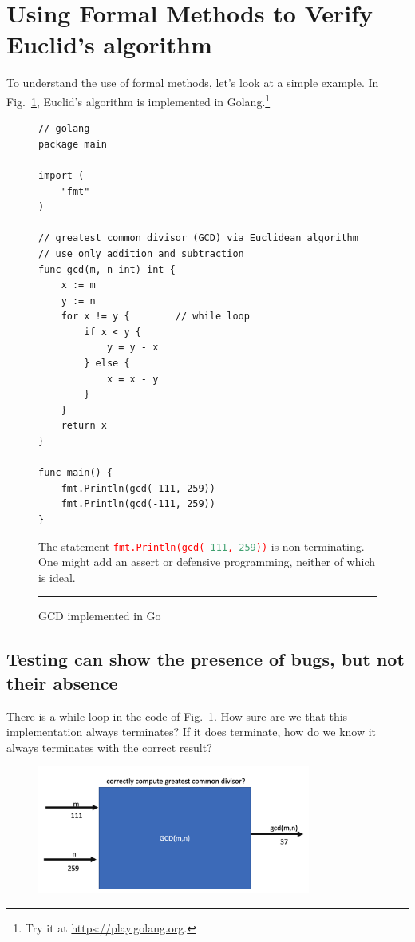 \documentclass[runningheads,12pt]{article}
\newcommand{\e}[1]{\lstinline[language=eiffel]|#1|}
\begin{document}
\section{Using Formal Methods to Verify Euclid's algorithm}

\noindent To understand the use of formal methods, let's look at a simple example. In Fig.~\ref{fig:gcd-c}, Euclid's algorithm is implemented in Golang.\footnote{%
Try it at \url{https://play.golang.org}.} 

\begin{figure}[!htb]
\begin{framed}
\begin{Verbatim}[fontsize=\small]
// golang
package main

import (
	"fmt"
)

// greatest common divisor (GCD) via Euclidean algorithm
// use only addition and subtraction 
func gcd(m, n int) int {
	x := m
	y := n
	for x != y {		// while loop
		if x < y {
			y = y - x
		} else {
			x = x - y
		}
	}
	return x
}

func main() {
	fmt.Println(gcd( 111, 259))
	fmt.Println(gcd(-111, 259))
}	
\end{Verbatim}
\end{framed}
The statement \textcolor{red}{\e{fmt.Println(gcd(-111, 259))}} is non-terminating. One might add an assert or defensive programming, neither of which is ideal. 
\caption{GCD implemented in Go}
\label{fig:gcd-c}
\noindent\rule{\textwidth}{0.5pt}
\end{figure}


\subsection{Testing can show the presence of bugs, but not their absence}

There is a while loop in the code of Fig.~\ref{fig:gcd-c}. How sure are we that this implementation always terminates? If it does terminate, how do we know it always terminates with the correct result?

\begin{figure}[hbt]
  \includegraphics[width=0.8\textwidth]{images/gcd.png}
\end{figure}
\end{document}
